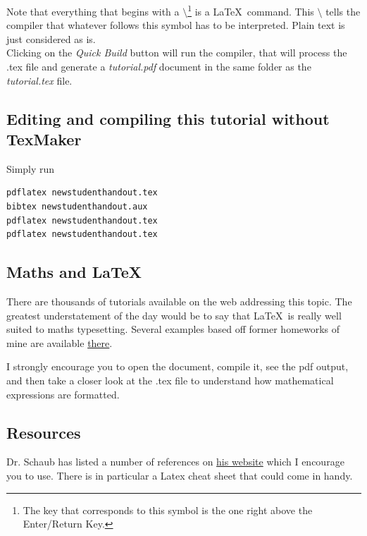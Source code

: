 Note that everything that begins with a $\setminus$\footnote{The key that corresponds to this symbol is the one right above the Enter/Return Key.} is a \LaTeX\ command. This $\setminus$ tells the compiler that whatever follows this symbol has to be interpreted. Plain text is just considered as is. \\
Clicking on the \textit{Quick Build} button will run the compiler, that will process the .tex file and generate a \textit{tutorial.pdf} document in the same folder as the \textit{tutorial.tex} file.

\subsection{Editing and compiling this tutorial without TexMaker}
Simply run 

\begin{lstlisting}[language = {}]
pdflatex newstudenthandout.tex
bibtex newstudenthandout.aux
pdflatex newstudenthandout.tex
pdflatex newstudenthandout.tex
\end{lstlisting}


\subsection{Maths and \LaTeX }
There are thousands of tutorials available on the web addressing this topic. The greatest understatement of the day would be to say that \LaTeX\ is really well suited to maths typesetting. Several examples based off former homeworks of mine are available \href{https://drive.google.com/file/d/0Bzf79yzZcPJJSnJKOFdrLVhtSG8/view?usp=sharing}{there}.

I strongly encourage you to open the document, compile it, see the pdf output, and then take a closer look at the .tex file to understand how mathematical expressions are formatted.
\subsection*{Resources}
Dr. Schaub has listed a number of references on \href{http://hanspeterschaub.info/AVS-LaTeX.html}{his website} which I encourage you to use. There is in particular a Latex cheat sheet that could come in handy.  
